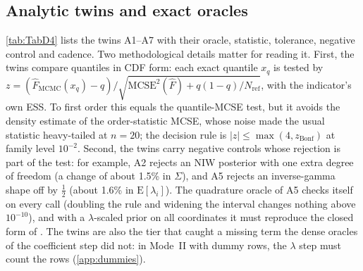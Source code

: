 \subsection{Analytic twins and exact oracles}\label{app:twins}

\cref{tab:TabD4} lists the twins A1--A7 with their oracle, statistic, tolerance, negative
control and cadence.
Two methodological details matter for reading it.
First, the twins compare quantiles in CDF form: each exact quantile $x_q$ is tested by $z =
(\hat F_{\mathrm{MCMC}}(x_q) - q)/\sqrt{\mathrm{MCSE}^2(\hat F) + q(1-q)/N_{\mathrm{ref}}}$, with
the indicator's own ESS.
To first order this equals the quantile-MCSE test, but it avoids the density estimate of the
order-statistic MCSE, whose noise made the usual statistic heavy-tailed at $n = 20$; the decision
rule is $|z| \le \max(4, z_{\mathrm{Bonf}})$ at family level $10^{-2}$.
Second, the twins carry negative controls whose rejection is part of the test: for example, A2
rejects an NIW posterior with one extra degree of freedom (a change of about 1.5\% in $\Sigma$), and
A5 rejects an inverse-gamma shape off by $\frac12$ (about 1.6\% in $\mathrm{E}[\lambda_i]$).
The quadrature oracle of A5 checks itself on every call (doubling the rule and widening the interval
changes nothing above $10^{-10}$), and with a $\lambda$-scaled prior on all coordinates it must
reproduce the closed form of \citet{chan2022asymmetric}.
The twins are also the tier that caught a missing term the dense oracles of the coefficient step did
not: in Mode~II with dummy rows, the $\lambda$ step must count the rows (\cref{app:dummies}).

\begin{table}[!htbp]
\centering\footnotesize
\caption{Analytic twins and exact oracles A1--A7: oracle, statistic and tolerance, negative
control and its measured power, cadence, and result on the release commit.}
\label{tab:TabD4}

\end{table}

